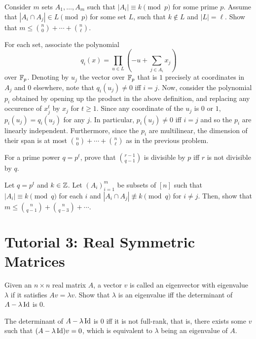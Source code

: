 \documentclass{article}
\begin{document}
	\begin{exercise}
		Consider $m$ sets $A_1,\ldots,A_m$ such that $|A_i| \equiv k \pmod{p}$ for some prime $p$. Assume that $|A_i \cap A_j| \in L \pmod{p}$ for some set $L$, such that $k \not\in L$ and $|L| = \ell$. Show that $m \le \binom{n}{0}+\cdots+\binom{n}{\ell}$.
	\end{exercise}
	\begin{solution*}
		For each set, associate the polynomial
		\[ q_i(x) = \prod_{u \in L} \left( -u + \sum_{j \in A_i} x_j \right) \]
		over $\mathbb{F}_p$. Denoting by $u_j$ the vector over $\mathbb{F}_p$ that is $1$ precisely at coordinates in $A_j$ and $0$ elsewhere, note that $q_i(u_j) \ne 0$ iff $i = j$. Now, consider the polynomial $p_i$ obtained by opening up the product in the above definition, and replacing any occurence of $x_j^t$ by $x_j$ for $t \ge 1$. Since any coordinate of the $u_j$ is $0$ or $1$, $p_i(u_j) = q_i(u_j)$ for any $j$. In particular, $p_i(u_j) \ne 0$ iff $i = j$ and so the $p_i$ are linearly independent. Furthermore, since the $p_i$ are multilinear, the dimension of their span is at most $\binom{n}{0} + \cdots + \binom{n}{\ell}$ as in the previous problem.
	\end{solution*}

	\begin{exercise}
		For a prime power $q = p^t$, prove that $\binom{r-1}{q-1}$ is divisible by $p$ iff $r$ is not divisible by $q$.
	\end{exercise}
	\begin{solution*}
		
	\end{solution*}

	\begin{exercise}
		Let $q = p^t$ and $k \in \mathbb{Z}$. Let $(A_i)_{i=1}^m$ be subsets of $[n]$ such that $|A_i| \equiv k \pmod{q}$ for each $i$ and $|A_i \cap A_j| \not\equiv k \pmod{q}$ for $i \ne j$. Then, show that $m \le \binom{n}{q-1} + \binom{n}{q-3} + \cdots$.
	\end{exercise}
	\begin{solution*}
		
	\end{solution*}

\section{Tutorial 3: Real Symmetric Matrices}

	\begin{exercise}
		Given an $n \times n$ real matrix $A$, a vector $v$ is called an eigenvector with eigenvalue $\lambda$ if it satisfies $Av = \lambda v$. Show that $\lambda$ is an eigenvalue iff the determinant of $A-\lambda\operatorname{Id}$ is $0$.
	\end{exercise}
	\begin{solution*}
		The determinant of $A-\lambda\operatorname{Id}$ is $0$ iff it is not full-rank, that is, there exists some $v$ such that $(A-\lambda\operatorname{Id})v = 0$, which is equivalent to $\lambda$ being an eigenvalue of $A$.
	\end{solution*}
\end{document}
